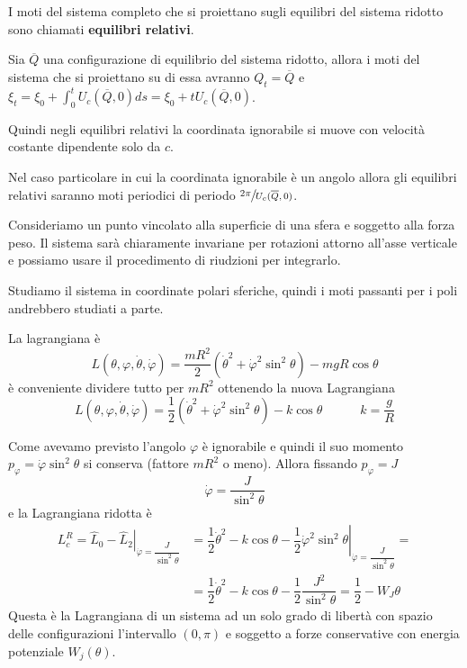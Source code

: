 \documentclass[11pt,a4paper,twoside]{book}
\newenvironment{esempio}[1][Esempio]{ 
  \begin{center}\begin{tcolorbox}[
  title={#1:\\},
  width=0.9\linewidth,
  flush right,
  enhanced jigsaw, 
  colback=white, 
  frame hidden, 
  sharpish corners, arc=3mm,
  borderline west = {1pt}{0pt}{gray},
  borderline south = {1pt}{0pt}{gray},
  coltitle=black, 
  fonttitle=\small\bfseries, 
  attach title to upper, 
  breakable,
  top=2.5pt, bottom=0.3pt]\small
  }{
 \normalsize \end{tcolorbox}\end{center}
}
\theoremstyle{esss}
\theoremstyle{dotless}
\numberwithin{equation}{section} %
\begin{document}
I moti del sistema completo che si proiettano sugli equilibri del sistema ridotto sono chiamati \textbf{equilibri relativi}. 

Sia $\overline{Q}$ una configurazione di equilibrio del sistema ridotto, allora i moti del sistema che si proiettano su di essa avranno $Q_t=\overline{Q}$ e $\xi_t=\xi_0+\int_0^t U_c(\overline{Q},0) ds=\xi_0+tU_c(\overline{Q},0)$.

Quindi negli equilibri relativi la coordinata ignorabile si muove con velocità costante dipendente solo da $c$. 

Nel caso particolare in cui la coordinata ignorabile è un angolo allora gli equilibri relativi saranno moti periodici di periodo $\sfrac{2\pi}{U_c(\overline{Q},0)}$.


\begin{esempio}[Pendolo sferico]
Consideriamo un punto vincolato alla superficie di una sfera e soggetto alla forza peso. Il sistema sarà chiaramente invariane per rotazioni attorno all'asse verticale e possiamo usare il procedimento di riudzioni per integrarlo.

Studiamo il sistema in coordinate polari sferiche, quindi i moti passanti per i poli andrebbero studiati a parte.

La lagrangiana è
\[
L(\theta,\varphi,\dot{\theta},\dot{\varphi})=\dfrac{mR^2}{2}(\dot{\theta}^2+\dot{\varphi}^2\sin^2{\theta})-mgR\cos{\theta}
\]
è conveniente dividere tutto per $mR^2$ ottenendo la nuova Lagrangiana
\[
L(\theta,\varphi,\dot{\theta},\dot{\varphi})=\dfrac{1}{2}(\dot{\theta}^2+\dot{\varphi}^2\sin^2{\theta})-k\cos{\theta}\qquad \quad k=\dfrac{g}{R}
\]

Come avevamo previsto l'angolo $\varphi$ è ignorabile e quindi il suo momento  $p_\varphi=\dot{\varphi}\sin^2{\theta}$ si conserva (fattore $mR^2$ o meno). Allora fissando $p_\varphi=J$
\[
\dot{\varphi}=\dfrac{J}{\sin^2{\theta}}
\]
e la Lagrangiana ridotta è
\begin{align*}
L^R_c=\hat{L}_0-\left.\hat{L}_2\right|_{\dot{\varphi}=\dfrac{J}{\sin^2{\theta}}}&=\dfrac{1}{2}\dot{\theta}^2-k\cos{\theta}-\left.\dfrac{1}{2}\dot{\varphi}^2\sin^2{\theta}\right|_{ \dot{\varphi}=\dfrac{J}{\sin^2{\theta}} }=\\
&=\dfrac{1}{2}\dot{\theta}^2-k\cos{\theta}-\dfrac{1}{2}\dfrac{J^2}{\sin^2{\theta}}=\dfrac{1}{2}-W_J{\theta}
\end{align*}
Questa è la Lagrangiana di un sistema ad un solo grado di libertà con spazio delle configurazioni l'intervallo $(0,\pi)$ e soggetto a forze conservative con energia potenziale $W_j(\theta)$.


\end{esempio}
\end{document}
